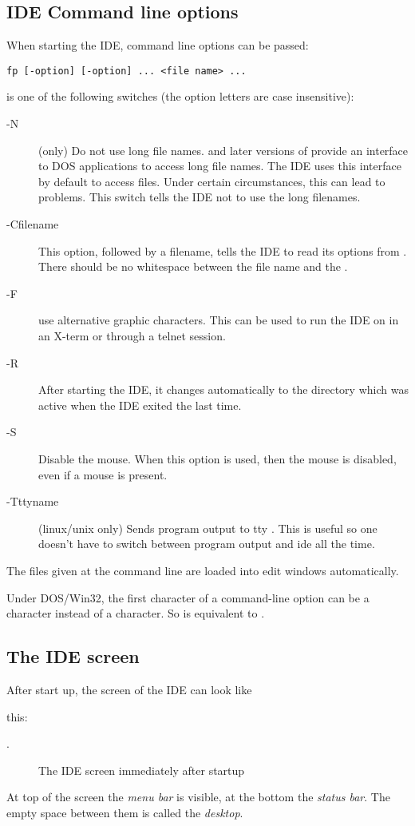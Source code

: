 \subsection{IDE Command line options}
When starting the IDE, command line options can be passed:
\begin{verbatim}
fp [-option] [-option] ... <file name> ...
\end{verbatim}
 is one of the following switches (the option letters
are case insensitive):
\begin{description}
\item [-N] (\dos only) Do not use long file names.  and later
versions of \windows provide an interface to DOS applications to access 
long file names. 
The IDE uses this interface by default to access files. Under certain 
circumstances, this can lead to problems. This switch tells the IDE not to
use the long filenames.
\item [-Cfilename] This option, followed by a filename, tells the IDE to
read its options from . There should be no whitespace between
the file name and the .
\item [-F] use alternative graphic characters. This can be used to run the
IDE on \linux in an X-term or through a telnet session.
\item [-R] After starting the IDE, it changes automatically to the directory
which was active when the IDE exited the last time.
\item [-S] Disable the mouse. When this option is used, then the mouse is
disabled, even if a mouse is present.
\item[-Tttyname] (linux/unix only) Sends program output to tty . 
This is useful so one doesn't have to switch between program output and ide
all the time.
\end{description}
The files given at the command line are loaded into edit windows automatically.

\begin{remark}
Under DOS/Win32, the first character of a command-line option can be a \var{/}
character instead of a \var{-} character. So  is equivalent to .
\end{remark}

\subsection{The IDE screen}

After start up, the screen of the IDE can look like 
\begin{htmlonly}
this:
\end{htmlonly}
\begin{latexonly}
.
\begin{figure}
\caption{The IDE screen immediately after startup}
\label{fig:idestart}
\ifpdf
{}
\else
{}
\fi
\end{figure}
\end{latexonly}
At top of the screen the \emph{menu bar} is visible, at the bottom
the \emph{status bar}. The empty space between them is called the
\emph{desktop}.

